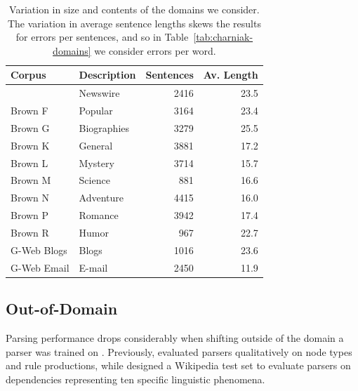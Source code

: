 \begin{landscape}

\end{landscape}

\begin{landscape}

\end{landscape}

\begin{table}
\begin{center}
\begin{tabular}{|llrr|}
	\hline
		Corpus & Description & Sentences & Av. Length \\
	\hline
	\hline
		\wsj 23 & Newswire & 2416 & 23.5 \\
		Brown F & Popular & 3164 & 23.4 \\
		Brown G & Biographies & 3279 & 25.5 \\
		Brown K & General & 3881 & 17.2 \\
		Brown L & Mystery & 3714 & 15.7 \\
		Brown M & Science & 881 & 16.6 \\
		Brown N & Adventure & 4415 & 16.0 \\
		Brown P & Romance & 3942 & 17.4 \\
		Brown R & Humor & 967 & 22.7 \\
		G-Web Blogs & Blogs & 1016 & 23.6 \\
		G-Web Email & E-mail & 2450 & 11.9 \\
	\hline
\end{tabular}
\caption[Variation in size and contents of the domains we consider.]{ \label{tab:domain-info}
	Variation in size and contents of the domains we consider.	The variation in
	average sentence lengths skews the results for errors per sentences, and so
	in Table~\ref{tab:charniak-domains} we consider errors per word.
}
\end{center}
\end{table}

\subsection{Out-of-Domain}

Parsing performance drops considerably when shifting outside of the domain a
parser was trained on \parencite{Gildea:2001}.
Previously, \textcite{Clegg:2005:EIT:1626315.1626317} evaluated parsers qualitatively on
node types and rule productions, while  \textcite{Bender:2011:PEO:2145432.2145479}
designed a Wikipedia test set to evaluate parsers on dependencies representing
ten specific linguistic phenomena.

